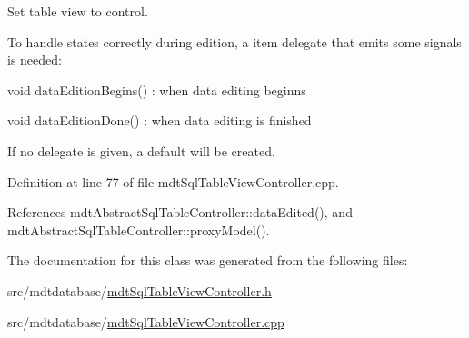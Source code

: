 Set table view to control. 

To handle states correctly during edition, a item delegate that emits some signals is needed\-:
\begin{DoxyItemize}
\item void data\-Edition\-Begins() \-: when data editing beginns
\item void data\-Edition\-Done() \-: when data editing is finished
\end{DoxyItemize}

If no delegate is given, a default will be created. 

Definition at line 77 of file mdt\-Sql\-Table\-View\-Controller.\-cpp.



References mdt\-Abstract\-Sql\-Table\-Controller\-::data\-Edited(), and mdt\-Abstract\-Sql\-Table\-Controller\-::proxy\-Model().



The documentation for this class was generated from the following files\-:\begin{DoxyCompactItemize}
\item 
src/mdtdatabase/\hyperlink{mdt_sql_table_view_controller_8h}{mdt\-Sql\-Table\-View\-Controller.\-h}\item 
src/mdtdatabase/\hyperlink{mdt_sql_table_view_controller_8cpp}{mdt\-Sql\-Table\-View\-Controller.\-cpp}\end{DoxyCompactItemize}
